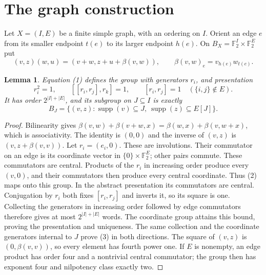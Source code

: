 \documentclass[11pt,a4paper]{article}
\newtheorem{lemma}[theorem]{Lemma}
\newcommand{\F}{\mathbb F_2}
\begin{document}
\section{The graph construction}
Let $X=(I,E)$ be a finite simple graph, with an ordering on $I$. Orient
an edge $e$ from its smaller endpoint $t(e)$ to its larger endpoint $h(e)$.
On $B_X=\F^I\times\F^E$ put
\[
 (v,z)(w,u)=(v+w,z+u+\beta(v,w)),\qquad
 \beta(v,w)_e=v_{h(e)}w_{t(e)}.
 \tag{1}
\]
\begin{lemma}
Equation (1) defines the group with generators $r_i$, and presentation
\[
 r_i^2=1,\qquad [[r_i,r_j],r_k]=1,\qquad
 [r_i,r_j]=1\quad(\{i,j\}\notin E).
 \tag{2}
\]
It has order $2^{|I|+|E|}$, and its subgroup on $J\subseteq I$ is exactly
\[
 B_J=\{(v,z):\operatorname{supp}(v)\subseteq J,
 \ \operatorname{supp}(z)\subseteq E[J]\}.
 \tag{3}
\]
\end{lemma}
\begin{proof}
Bilinearity gives
$\beta(v,w)+\beta(v+w,x)=\beta(w,x)+\beta(v,w+x)$, which is associativity.
The identity is $(0,0)$ and the inverse of $(v,z)$ is
$(v,z+\beta(v,v))$. Let $r_i=(e_i,0)$. These are involutions. Their
commutator on an edge is its coordinate vector in $\{0\}\times\F^E$;
other pairs commute. These commutators are central. Products of the $r_i$
in increasing order produce every $(v,0)$, and their commutators then
produce every central coordinate. Thus (2) maps onto this group.
In the abstract presentation its commutators are central. Conjugation by
$r_i$ both fixes $[r_i,r_j]$ and inverts it, so its square is one.
Collecting the generators in increasing order followed by edge commutators
therefore gives at most $2^{|I|+|E|}$ words. The coordinate group attains
this bound, proving the presentation and uniqueness. The same collection
and the coordinate generators internal to $J$ prove (3) in both directions.
The square of $(v,z)$ is $(0,\beta(v,v))$, so every element has fourth
power one. If $E$ is nonempty, an edge product has order four and a
nontrivial central commutator; the group then has exponent four and
nilpotency class exactly two.
\end{proof}
\end{document}
